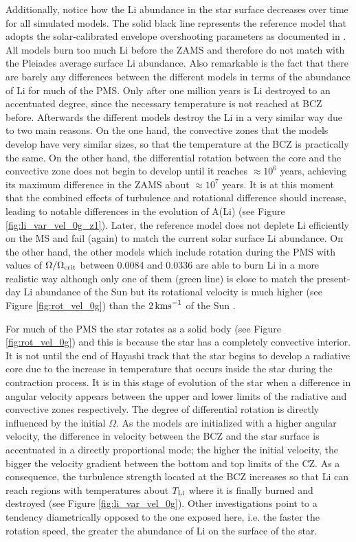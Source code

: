 \documentclass[fleqn,usenatbib]{mnras}
\begin{document}
Additionally, notice how the Li abundance in the star surface decreases over time for all simulated models. The solid black line represents the reference model that adopts the solar-calibrated envelope overshooting parameters as documented in \citet{Choi2016}. All models burn too much Li before the ZAMS and therefore do not match with the Pleiades average surface Li abundance. Also remarkable is the fact that there are barely any differences between the different models in terms of the abundance of Li for much of the PMS. Only after one million years is Li destroyed to an accentuated degree, since the necessary temperature is not reached at BCZ before. Afterwards the different models destroy the Li in a very similar way due to two main reasons. On the one hand, the convective zones that the models develop have very similar sizes, so that the temperature at the BCZ is practically the same. On the other hand, the differential rotation between the core and the convective zone does not begin to develop until it reaches $ \approx 10^6$ years, achieving its maximum difference in the ZAMS about $ \approx 10^7$ years. It is at this moment that the combined effects of turbulence and rotational difference should increase, leading to notable differences in the evolution of A(Li) (see Figure \ref{fig:li_var_vel_0g_z1}). Later, the reference model does not deplete Li efficiently on the MS and fail (again) to match the current solar surface Li abundance. On the other hand, the other models which include rotation during the PMS with values of $\Omega / \Omega_{\mathrm{crit}}$ between 0.0084 and 0.0336 are able to burn Li in a more realistic way although only one of them (green line) is close to match the present-day Li abundance of the Sun but its rotational velocity is much higher (see Figure \ref{fig:rot_vel_0g}) than the $2\,\mathrm{kms}^{-1}$ of the Sun \citep{Gill2012}. \par

For much of the PMS the star rotates as a solid body (see Figure \ref{fig:rot_vel_0g}) and this is because the star has a completely convective interior. It is not until the end of Hayashi track that the star begins to develop a radiative core due to the increase in temperature that occurs inside the star during the contraction process. It is in this stage of evolution of the star when a difference in angular velocity appears between the upper and lower limits of the radiative and convective zones respectively. The degree of differential rotation is directly influenced by the initial $\Omega$. As the models are initialized with a higher angular velocity, the difference in velocity between the BCZ and the star surface is accentuated in a directly proportional mode; the higher the initial velocity, the bigger the velocity gradient between the bottom and top limits of the CZ. As a consequence, the turbulence strength located at the BCZ increases so that Li can reach regions with temperatures about $T_{\mathrm{Li}}$ where it is finally burned and destroyed (see Figure  \ref{fig:li_var_vel_0g}). Other investigations \citep{Bouvier2018, Baraffe2017}  point to a tendency diametrically opposed to the one exposed here, i.e. the faster the rotation speed, the greater the abundance of Li on the surface of the star. \par
\end{document}
